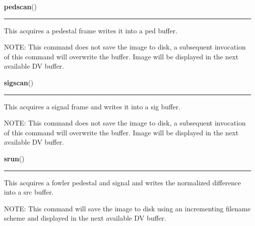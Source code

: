     \vspace{0.5ex}

    \begin{boxedminipage}{\textwidth}

    \raggedright \textbf{pedscan}()

    \vspace{-1.5ex}

    \rule{\textwidth}{0.5\fboxrule}
    This acquires a pedestal frame writes it into a ped buffer.

    NOTE: This command does not save the image to disk, a subsequent 
    invocation of this command will overwrite the buffer. Image will be 
    displayed in the next available DV buffer.

    \vspace{1ex}

    \end{boxedminipage}

    \label{runrun:sigscan}

    \vspace{0.5ex}

    \begin{boxedminipage}{\textwidth}

    \raggedright \textbf{sigscan}()

    \vspace{-1.5ex}

    \rule{\textwidth}{0.5\fboxrule}
    This acquires a signal frame and writes it into a sig buffer.

    NOTE: This command does not save the image to disk, a subsequent 
    invocation of this command will overwrite the buffer. Image will be 
    displayed in the next available DV buffer.

    \vspace{1ex}

    \end{boxedminipage}

    \label{runrun:srun}

    \vspace{0.5ex}

    \begin{boxedminipage}{\textwidth}

    \raggedright \textbf{srun}()

    \vspace{-1.5ex}

    \rule{\textwidth}{0.5\fboxrule}
    This acquires a fowler pedestal and signal and writes the normalized 
    difference into a src buffer.

    NOTE: This command will save the image to disk using an incrementing 
    filename scheme and displayed in the next available DV buffer.

    \vspace{1ex}

    \end{boxedminipage}


